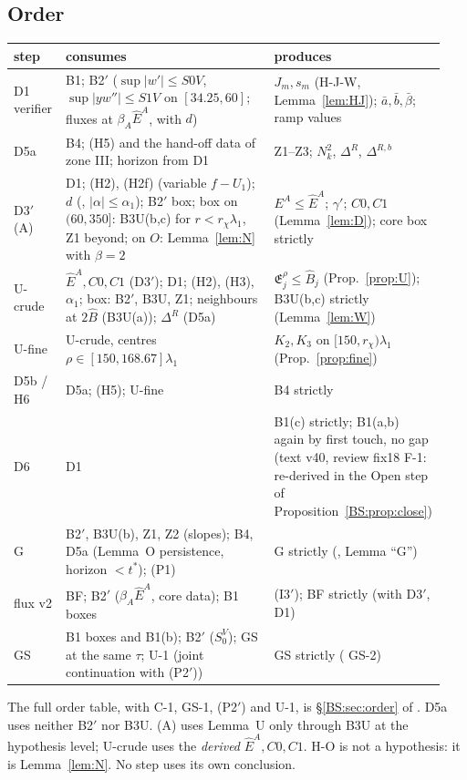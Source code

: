 \documentclass[11pt]{article}
\theoremstyle{definition}\newtheorem{definition}[theorem]{Definition}
\theoremstyle{remark}\newtheorem{remark}[theorem]{Remark}
\newcommand{\fn}[1]{\texttt{\detokenize{#1}}}
\newcommand{\E}{\mathfrak E}\newcommand{\B}{\mathfrak B}\newcommand{\Bh}{\hat B}\newcommand{\Eh}{\hat E^A}
\begin{document}
\subsection{Order}
\begin{center}\small\begin{tabular}{@{}p{0.12\linewidth}p{0.48\linewidth}p{0.34\linewidth}@{}}\toprule
step & consumes & produces\\\midrule
D1 verifier & B1; B2$'$ ($\sup|w'|\le S0V$, $\sup|yw''|\le S1V$ on $[34.25,60]$; fluxes at $\beta_A\Eh$, with $d$) & $J_m,s_m$ (H-J-W, Lemma~\ref{lem:HJ}); $\bar a,\bar b,\bar\beta$; ramp values\\
D5a & B4; (H5) and the hand-off data of zone III; horizon from D1 & Z1--Z3; $N_k^2$, $\Delta^R$, $\Delta^{R,b}$\\
D3$'$ (A) & D1; (H2), (H2f) (variable $f-U_1$); $d$ (\fn{b0_dprof}, $|\alpha|\le\alpha_1$); B2$'$ box; box on $(60,350]$: B3U(b,c) for $r<r_\chi\lambda_1$, Z1 beyond; on $O$: Lemma~\ref{lem:N} with $\beta=2$ & $E^A\le\Eh$; $\gamma'$; $C0,C1$ (Lemma~\ref{lem:D}); core box strictly\\
U-crude & $\Eh,C0,C1$ (D3$'$); D1; (H2), (H3), $\alpha_1$; box: B2$'$, B3U, Z1; neighbours at $2\Bh$ (B3U(a)); $\Delta^R$ (D5a) & $\E^\rho_j\le\Bh_j$ (Prop.~\ref{prop:U}); B3U(b,c) strictly (Lemma~\ref{lem:W})\\
U-fine & U-crude, centres $\rho\in[150,168.67]\lambda_1$ & $K_2,K_3$ on $[150,r_\chi)\lambda_1$ (Prop.~\ref{prop:fine})\\
D5b / H6 & D5a; (H5); U-fine & B4 strictly\\
D6 & D1 & B1(c) strictly; B1(a,b) again by first touch, no gap (text v40, review fix18 F-1: re-derived in the Open step of Proposition~\ref{BS:prop:close})\\
G & B2$'$, B3U(b), Z1, Z2 (slopes); B4, D5a (Lemma~O persistence, horizon $<t^*$); (P1) & G strictly (\fn{continuation_v42.tex}, Lemma ``G'')\\
flux v2 & BF; B2$'$ ($\beta_A\Eh$, core data); B1 boxes & (I3$'$); BF strictly (with D3$'$, D1)\\
GS & B1 boxes and B1(b); B2$'$ ($S^V_0$); GS at the same $\tau$; U-1 (joint continuation with (P2$'$)) & GS strictly (\fn{GS_lemma_v42.tex} GS-2)\\\bottomrule\end{tabular}\end{center}
\noindent The full order table, with C-1, GS-1, (P2$'$) and U-1, is \S\ref{BS:sec:order} of \fn{bootstrap_v42.tex}.
D5a uses neither B2$'$ nor B3U. (A) uses Lemma~U only through B3U at the hypothesis level; U-crude uses the \emph{derived} $\Eh,C0,C1$. H-O is not a hypothesis: it is Lemma~\ref{lem:N}. No step uses its own conclusion.
\end{document}
